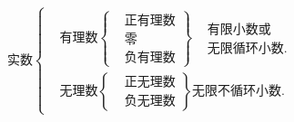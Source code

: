 \(
  \text{实数}
  \begin{cases}
   &\text{有理数}\left\{
            \begin{aligned}
            &\text{正有理数}  \\
            &\text{零}\\
            &\text{负有理数}
            \end{aligned}
            \right\}

   \begin{aligned}
     &\text{有限小数或}\\
     &\text{无限循环小数}.
   \end{aligned}\\

   &\text{无理数}\left\{
            \begin{aligned}
            &\text{正无理数}  \\
            &\text{负无理数}
            \end{aligned}
            \right\}
   \text{无限不循环小数.}
  \end{cases}
  \)
  